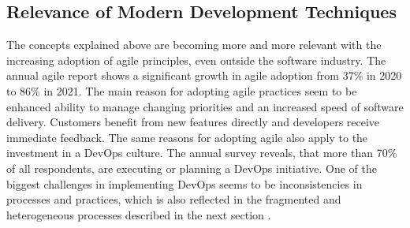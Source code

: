     \subsection{Relevance of Modern Development Techniques}
    The concepts explained above are becoming more and more relevant with the increasing adoption of agile principles, even outside the software industry. The annual agile report shows a significant growth in agile adoption from 37\% in 2020 to 86\% in 2021. The main reason for adopting agile practices seem to be enhanced ability to manage changing priorities and an increased speed of software delivery. Customers benefit from new features directly and developers receive immediate feedback. The same reasons for adopting agile also apply to the investment in a DevOps culture. The annual survey reveals, that more than 70\% of all respondents, are executing or planning a DevOps initiative. One of the biggest challenges in implementing DevOps seems to be inconsistencies in processes and practices, which is also reflected in the fragmented and heterogeneous processes described in the next section \cite{agilereport2021}.
